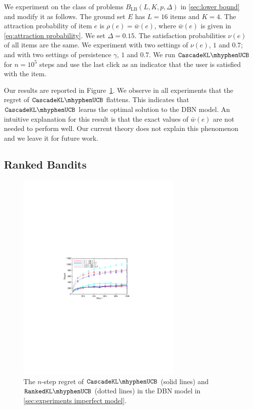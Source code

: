 We experiment on the class of problems $B_\mathrm{LB}(L, K, p, \Delta)$ in \cref{sec:lower bound} and modify it as follows. The ground set $E$ has $L = 16$ items and $K = 4$. The attraction probability of item $e$ is $\rho(e) = \bar{w}(e)$, where $\bar{w}(e)$ is given in \eqref{eq:attraction probability}. We set $\Delta = 0.15$. The satisfaction probabilities $\nu(e)$ of all items are the same. We experiment with two settings of $\nu(e)$, $1$ and $0.7$; and with two settings of persistence $\gamma$, $1$ and $0.7$. We run $\cascadeklucb$ for $n = 10^5$ steps and use the last click as an indicator that the user is satisfied with the item.

Our results are reported in Figure~\ref{fig:DBN trends}. We observe in all experiments that the regret of $\cascadeklucb$ flattens. This indicates that $\cascadeklucb$ learns the optimal solution to the DBN model. An intuitive explanation for this result is that the exact values of $\bar{w}(e)$ are not needed to perform well. Our current theory does not explain this phenomenon and we leave it for future work.


\subsection{Ranked Bandits}
\label{sec:experiments ranked bandits}

\begin{figure}[t]
  \centering
  \includegraphics[width=3.2in, bb=2.15in 4.25in 6.15in 6.75in]{Figures/DBNTrends}
  \caption{The $n$-step regret of $\cascadeklucb$ (solid lines) and $\rankedklucb$ (dotted lines) in the DBN model in \cref{sec:experiments imperfect model}.}
  \label{fig:DBN trends}
\end{figure}

